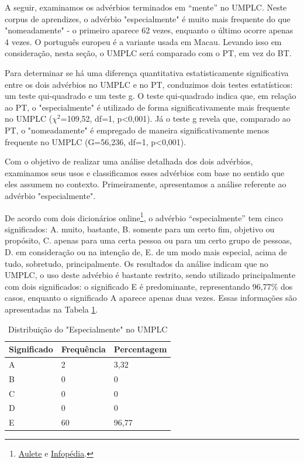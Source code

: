 \documentclass[portuguese]{textolivre}
\begin{document}
A seguir, examinamos os advérbios terminados em “mente” no UMPLC. Neste corpus de aprendizes, o advérbio "especialmente" é muito mais frequente do que "nomeadamente" - o primeiro aparece 62 vezes, enquanto o último ocorre apenas 4 vezes. O português europeu é a variante usada em Macau. Levando isso em consideração, nesta seção, o UMPLC será comparado com o PT, em vez do BT.

Para determinar se há uma diferença quantitativa estatisticamente significativa entre os dois advérbios no UMPLC e no PT, conduzimos dois testes estatísticos: um teste qui-quadrado e um teste g. O teste qui-quadrado indica que, em relação ao PT, o "especialmente" é utilizado de forma significativamente mais frequente no UMPLC (\(\chi\)\(^2\)=109,52, df=1, p<0,001). Já o teste g revela que, comparado ao PT, o "nomeadamente" é empregado de maneira significativamente menos frequente no UMPLC (G=56,236, df=1, p<0,001).

Com o objetivo de realizar uma análise detalhada dos dois advérbios, examinamos seus usos e classificamos esses advérbios com base no sentido que eles assumem no contexto. Primeiramente, apresentamos a análise referente ao advérbio "especialmente".

De acordo com dois dicionários online\footnote{\href{https://www.aulete.com.br}{Aulete} e \href{https://www.infopedia.pt/dicionarios/lingua-portuguesa}{Infopédia}.}, o advérbio “especialmente” tem cinco significados: A. muito, bastante, B. somente para um certo fim, objetivo ou propósito, C. apenas para uma certa pessoa ou para um certo grupo de pessoas, D. em consideração ou na intenção de, E. de um modo mais especial, acima de tudo, sobretudo, principalmente. Os resultados da análise indicam que no UMPLC, o uso deste advérbio é bastante restrito, sendo utilizado principalmente com dois significados: o significado E é predominante, representando 96,77\% dos casos, enquanto o significado A aparece apenas duas vezes. Essas informações são apresentadas na Tabela \ref{tab10}.

\begin{table}[h]
\centering
\begin{threeparttable}
\caption{Distribuição do "Especialmente" no UMPLC}
\label{tab10}
\begin{tabular}{lll}
\toprule
Significado & Frequência & Percentagem \\ 
\midrule
A           & 2          & 3,32        \\ 
B           & 0          & 0           \\ 
C           & 0          & 0           \\ 
D           & 0          & 0           \\ 
E           & 60         & 96,77       \\ 
\bottomrule
\end{tabular}
\end{threeparttable}
\end{table}
\end{document}
